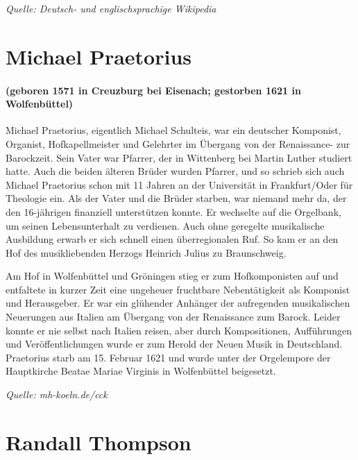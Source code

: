 \documentclass[11pt, ngermanm, titlepage]{article}
\begin{document}
\begin{multicols}{2}
	\textit{Quelle: Deutsch- und englischsprachige Wikipedia}
	
	\section*{Michael Praetorius}
	\paragraph{(geboren 1571 in Creuzburg bei Eisenach; gestorben 1621 in Wolfenbüttel)\newline}
	Michael Praetorius, eigentlich Michael Schulteis, war ein deutscher Komponist, Organist, Hofkapellmeister und Gelehrter im Übergang von der Renaissance- zur Barockzeit. Sein Vater war Pfarrer, der in Wittenberg bei Martin Luther studiert hatte. Auch die beiden älteren Brüder wurden Pfarrer, und so schrieb sich auch Michael Praetorius schon mit 11 Jahren an der Universität in Frankfurt/Oder für Theologie ein. Als der Vater und die Brüder starben, war niemand mehr da, der den 16-jährigen finanziell unterstützen konnte. Er wechselte auf die Orgelbank, um seinen Lebensunterhalt zu verdienen. Auch ohne geregelte musikalische Ausbildung erwarb er sich schnell einen überregionalen Ruf. So kam er an den Hof des musikliebenden Herzogs Heinrich Julius zu Braunschweig. 
	
	Am Hof in Wolfenbüttel und Gröningen stieg er zum Hofkomponisten auf und entfaltete in kurzer Zeit eine ungeheuer fruchtbare Nebentätigkeit als Komponist und Herausgeber. Er war ein glühender Anhänger der aufregenden musikalischen Neuerungen aus Italien am Übergang von der Renaissance zum Barock. Leider konnte er nie selbst nach Italien reisen, aber durch Kompositionen, Aufführungen und Veröffentlichungen wurde er zum Herold der Neuen Musik in Deutschland. Praetorius starb am 15. Februar 1621 und wurde unter der Orgelempore der Hauptkirche Beatae Mariae Virginis in Wolfenbüttel beigesetzt.
	
	\textit{Quelle: mh-koeln.de/cck}
	
	\section*{Randall Thompson}

\end{multicols}
\end{document}
